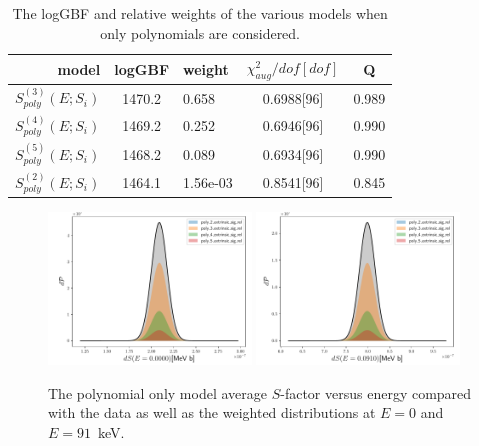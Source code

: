\documentclass[prd,10pt,superscriptaddress,notitlepage,tightenlines,nofootinbib,floatfix]{revtex4-1}
\begin{document}
\begin{table}
\begin{ruledtabular}
\begin{tabular}{rclcc}
model& logGBF& weight& $\chi_{aug}^2/dof[dof]$& Q\\
\hline
$S_{poly}^{(3)}(E; S_i)$& 1470.2 & 0.658 & 0.6988[96] & 0.989\\
$S_{poly}^{(4)}(E; S_i)$& 1469.2 & 0.252 & 0.6946[96] & 0.990\\
$S_{poly}^{(5)}(E; S_i)$& 1468.2 & 0.089 & 0.6934[96] & 0.990\\
$S_{poly}^{(2)}(E; S_i)$& 1464.1 & 1.56e-03 & 0.8541[96] & 0.845\\
\end{tabular}
\end{ruledtabular}
\caption{\label{tab:poly}
The logGBF and relative weights of the various models when only polynomials are considered.
}
\end{table}
    
\begin{figure}
\includegraphics[width=0.48\textwidth]{figures/S_E0.0000_hist_poly}
\includegraphics[width=0.48\textwidth]{figures/S_E0.0910_hist_poly}
\caption{\label{fig:poly}
The polynomial only model average $S$-factor versus energy compared with the data as well as the weighted distributions at $E=0$ and $E=91$~keV.}
\end{figure}
\end{document}
